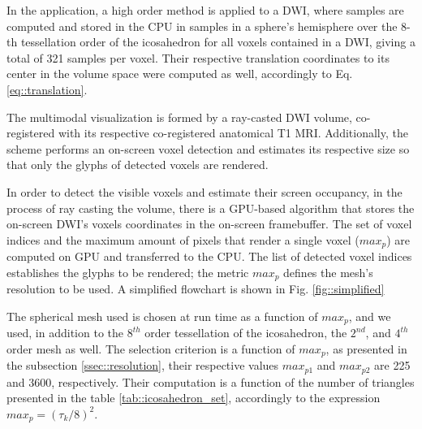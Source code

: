 \documentclass[twoside,twocolumn,10pt]{article}
\begin{document}
In the application, a high order method is applied to a DWI, where samples are computed and stored in the CPU in samples in a sphere's hemisphere over the 8-th tessellation order of the icosahedron for all voxels contained in a DWI, giving a total of 321 samples per voxel. Their respective translation coordinates to its center in the volume space were computed as well, accordingly to Eq. \ref{eq::translation}.



The multimodal visualization is formed by a ray-casted DWI volume, co-registered with its respective co-registered anatomical T1 MRI. Additionally, the scheme performs an on-screen voxel detection and estimates its respective size so that only the glyphs of detected voxels are rendered.

In order to detect the visible voxels and estimate their screen occupancy, in the process of ray casting the volume, there is a GPU-based algorithm that stores the on-screen DWI's voxels coordinates in the on-screen framebuffer. The set of voxel indices and the maximum amount of pixels that render a single voxel ($max_p$) are computed on GPU and transferred to the CPU. The list of detected voxel indices establishes the glyphs to be rendered; the metric $max_p$ defines the mesh's resolution to be used. A simplified flowchart is shown in Fig. \ref{fig::simplified}




The spherical mesh used is chosen at run time as a function of $max_p$, and we used, in addition to the $8^{th}$ order tessellation of the icosahedron, the $2^{nd}$, and $4^{th}$ order mesh as well. The selection criterion is a function of $max_p$, as presented in the subsection \ref{ssec::resolution}, their respective values $max_{p1}$ and $max_{p2}$ are 225 and 3600, respectively. Their computation is a function of the number of triangles presented in the table \ref{tab::icosahedron_set}, accordingly to the expression $max_p = (\tau_k/8)^2$.
\end{document}
